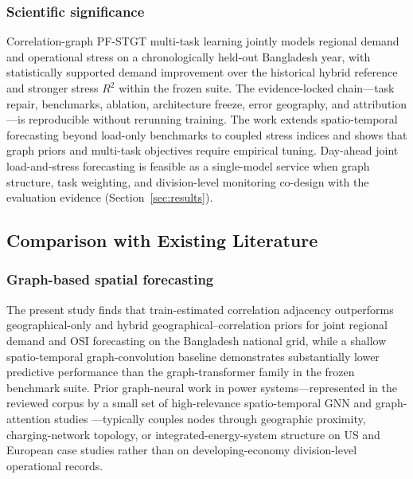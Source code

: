 \subsubsection{Scientific significance}\label{subsubsection:scientific_significance}

Correlation-graph PF-STGT multi-task learning jointly models regional demand and operational stress on a chronologically held-out Bangladesh year, with statistically supported demand improvement over the historical hybrid reference and stronger stress $R^2$ within the frozen suite. The evidence-locked chain---task repair, benchmarks, ablation, architecture freeze, error geography, and attribution---is reproducible without rerunning training. The work extends spatio-temporal forecasting beyond load-only benchmarks to coupled stress indices and shows that graph priors and multi-task objectives require empirical tuning. Day-ahead joint load-and-stress forecasting is feasible as a single-model service when graph structure, task weighting, and division-level monitoring co-design with the evaluation evidence (Section~\ref{sec:results}).

\subsection{Comparison with Existing Literature}\label{subsection:comparison_with_existing_literature}

\subsubsection{Graph-based spatial forecasting}\label{subsubsection:graph_based_spatial_forecasting}

The present study finds that train-estimated correlation adjacency outperforms geographical-only and hybrid geographical--correlation priors for joint regional demand and OSI forecasting on the Bangladesh national grid, while a shallow spatio-temporal graph-convolution baseline demonstrates substantially lower predictive performance than the graph-transformer family in the frozen benchmark suite. Prior graph-neural work in power systems---represented in the reviewed corpus by a small set of high-relevance spatio-temporal GNN and graph-attention studies \cite{Shi2024EVChargingGNN,Zhuang2024MultiScaleGNN,Wu2023TransferLearningGNN}---typically couples nodes through geographic proximity, charging-network topology, or integrated-energy-system structure on US and European case studies rather than on developing-economy division-level operational records.

